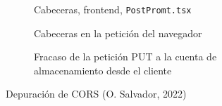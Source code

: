 \documentclass[11pt]{article}
\begin{document}
\begin{flushleft}
\begin{figure}[htb]
			\begin{subfigure}{.36\textwidth}
				\inputminted[fontsize=\tiny, firstline=80, lastline=91, linenos, frame=single, breaklines]{javascript}{../../frontend/src/components/PostPrompt.tsx}
				\vspace{.8cm}
				\caption{Cabeceras, frontend, \texttt{PostPromt.tsx}}
			\end{subfigure}
			\begin{subfigure}{.55\textwidth}
				\centering
				\caption{Cabeceras en la petición del navegador}
			\end{subfigure}
			\linebreak

			\begin{subfigure}{\textwidth}
				\centering
				\caption{Fracaso de la petición PUT a la cuenta de almacenamiento desde el cliente}
			\end{subfigure}
			\caption{Depuración de CORS (O. Salvador, 2022)}
		\end{figure}















\end{flushleft}
\end{document}
